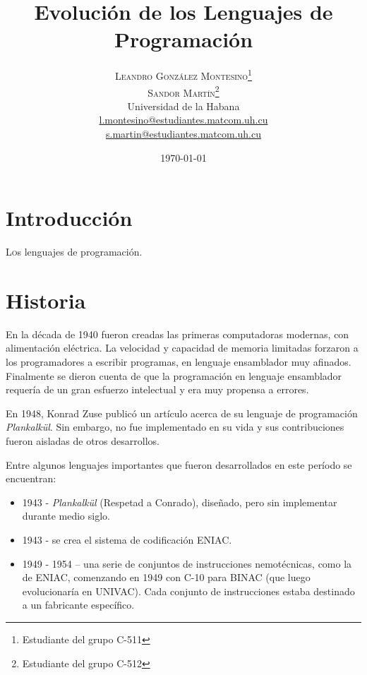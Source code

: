 \documentclass[twoside,twocolumn]{article}
\title{Evolución de los Lenguajes de Programación} %
\author{%
\textsc{Leandro González Montesino}\thanks{Estudiante del grupo C-511} \\[1ex] %
\textsc{Sandor Martín}\thanks{Estudiante del grupo C-512} \\[1ex]
\normalsize Universidad de la Habana \\ %
\normalsize \href{mailto:l.montesino@estudiantes.matcom.uh.cu}{l.montesino@estudiantes.matcom.uh.cu}\\ %
\normalsize \href{mailto:s.martin@estudiantes.matcom.uh.cu}{s.martin@estudiantes.matcom.uh.cu}
}
\date{\today} %
\begin{document}
\maketitle


\section{Introducción}

\lettrine[nindent=0em,lines=3]{L} os lenguajes de programación.



\section{Historia}

En la década de 1940 fueron creadas las primeras computadoras modernas, con alimentación eléctrica. La velocidad y capacidad de memoria limitadas forzaron a los programadores a escribir programas, en lenguaje ensamblador muy afinados. Finalmente se dieron cuenta de que la programación en lenguaje ensamblador requería de un gran esfuerzo intelectual y era muy propensa a errores.

En 1948, Konrad Zuse publicó un artículo acerca de su lenguaje de programación \textit{Plankalkül}. Sin embargo, no fue implementado en su vida y sus contribuciones fueron aisladas de otros desarrollos.

Entre algunos lenguajes importantes que fueron desarrollados en este período se encuentran: 
\begin{itemize}
\item     1943 - \textit{Plankalkül} (Respetad a Conrado), diseñado, pero sin implementar durante medio siglo.
\item   1943 - se crea el sistema de codificación ENIAC.
\item  1949 - 1954 -- una serie de conjuntos de instrucciones nemotécnicas, como la de ENIAC, comenzando en 1949 con C-10 para BINAC (que luego evolucionaría en UNIVAC). Cada conjunto de instrucciones estaba destinado a un fabricante específico.
\end{itemize}




\end{document}
